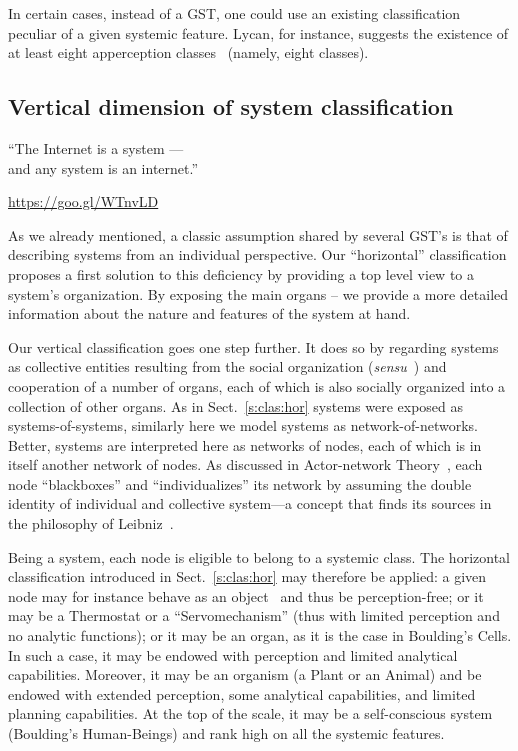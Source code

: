 \documentclass[twocolumn]{svjour3}
\def\M{\hbox{}}
\def\A{\hbox{}}
\def\K{\hbox{}}
\begin{document}
In certain cases, instead of
a GST, one could use an existing classification peculiar of a given systemic feature.
Lycan, for instance, suggests
the existence of at least eight apperception classes~\cite{Lycan96} (namely, eight
\A{} classes).



\subsection{Vertical dimension of system classification}\label{s:clas:ver}
\epigraph{``The Internet is a system --- \\and any system is an internet.''}
{\url{https://goo.gl/WTnvLD}}

As we already mentioned, a classic assumption shared by several GST's
is that of describing systems from an individual perspective. Our ``horizontal''
classification proposes a first solution to this deficiency by providing a top level view
to a system's organization. By exposing the main organs \M--\K{} we provide a more
detailed information about the nature and features of the system at hand.

Our vertical classification goes one step further.
It does so by regarding systems as collective entities
resulting from the social organization (\emph{sensu}~\cite{Bou56}) and cooperation of a number of organs,
each of which is also socially organized into a collection of other organs.
As in Sect.~\ref{s:clas:hor} systems were exposed as systems-of-systems, similarly here
we model systems as network-of-networks. Better, systems are interpreted here as networks of nodes,
each of which is in itself another network of nodes. As discussed in Actor-network Theory~\cite{Latour06},
each node ``blackboxes'' and ``individualizes'' its network by assuming the double
identity of individual and collective system---a concept that finds its sources in the
philosophy of Leibniz~\cite{DF14c}.

Being a system, 
each node is eligible to belong to a systemic class. The horizontal classification
introduced in Sect.~\ref{s:clas:hor} may therefore be applied:
a given node may for instance
behave as an object~\cite{RWB43} and thus be perception-free; or it may be a Thermostat or
a ``Servomechanism'' (thus with limited perception and no analytic functions); or it
may be an organ, as it is the case in Boulding's Cells. In such a case, it
may be endowed with perception and limited analytical capabilities. Moreover,
it may be an organism (a Plant or an Animal) and be endowed with extended perception,
some analytical capabilities, and limited planning capabilities. At the top of the scale,
it may be a self-conscious system (Boulding's Human-Beings) and rank high on all
the systemic features.
\end{document}
